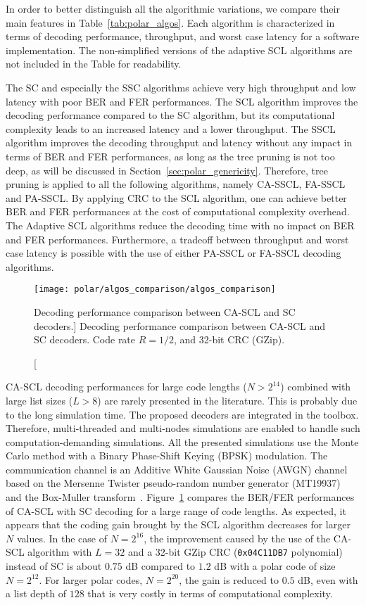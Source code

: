 In order to better distinguish all the algorithmic variations, we compare their
main features in Table~\ref{tab:polar_algos}. Each algorithm is characterized in
terms of decoding performance, throughput, and worst case latency for a software
implementation. The non-simplified versions of the adaptive SCL algorithms are
not included in the Table for readability.

The SC and especially the SSC algorithms achieve very high throughput and low
latency with poor BER and FER performances. The SCL algorithm improves the
decoding performance compared to the SC algorithm, but its computational
complexity leads to an increased latency and a lower throughput. The SSCL
algorithm improves the decoding throughput and latency without any impact in
terms of BER and FER performances, as long as the tree pruning is not too deep,
as will be discussed in Section~\ref{sec:polar_genericity}. Therefore, tree
pruning is applied to all the following algorithms, namely CA-SSCL, FA-SSCL and
PA-SSCL. By applying CRC to the SCL algorithm, one can achieve better BER and
FER performances at the cost of computational complexity overhead. The Adaptive
SCL algorithms reduce the decoding time with no impact on BER and FER
performances. Furthermore, a tradeoff between throughput and worst case latency
is possible with the use of either PA-SSCL or FA-SSCL decoding algorithms.

\begin{figure}[htp]
  \centering
  \texttt{[image: polar/algos\_comparison/algos\_comparison]}
  \caption
    [Decoding performance comparison between CA-SCL and SC decoders.]
    {Decoding performance comparison between CA-SCL and SC decoders.
    Code rate $R = 1/2$, and 32-bit CRC (GZip).}
  \label{plot:polar_algos_comparison}
\end{figure}

CA-SCL decoding performances for large code lengths ($N > 2^{14}$) combined with
large list sizes ($L > 8$) are rarely presented in the literature. This is
probably due to the long simulation time. The proposed decoders are integrated
in the \AFFECT toolbox. Therefore, multi-threaded and multi-nodes simulations
are enabled to handle such computation-demanding simulations. All the presented
simulations use the Monte Carlo method with a Binary Phase-Shift Keying (BPSK)
modulation. The communication channel is an Additive White Gaussian Noise (AWGN)
channel based on the Mersenne Twister pseudo-random number generator
(MT19937)~\cite{Matsumoto1998} and the Box-Muller transform~\cite{Box1958}.
Figure~\ref{plot:polar_algos_comparison} compares the BER/FER performances of
CA-SCL with SC decoding for a large range of code lengths. As expected, it
appears that the coding gain brought by the SCL algorithm decreases for larger
$N$ values. In the case of $N=2^{16}$, the improvement caused by the use of the
CA-SCL algorithm with $L=32$ and a 32-bit GZip CRC (\verb|0x04C11DB7|
polynomial) instead of SC is about $0.75$ dB compared to $1.2$ dB with a polar
code of size $N=2^{12}$. For larger polar codes, $N=2^{20}$, the gain is reduced
to $0.5$ dB, even with a list depth of $128$ that is very costly in terms of
computational complexity.

